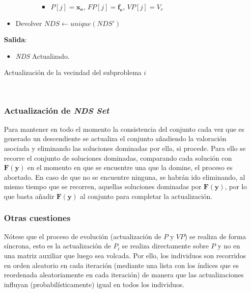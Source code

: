 \begin{center}
\begin{minipage}[H]{0.8\linewidth}
\begin{algorithm}[H]
\begin{itemize}
\begin{itemize}
\begin{itemize}
				\begin{itemize}
            		\vspace{0.15cm}\item $P[j]=\boldsymbol{x_e}$, $FP[j]=\boldsymbol{f_e}$, $VP[j]=V_e$
				\end{itemize}
        	\end{itemize}
        	\end{itemize}
        	\vspace{0.15cm}\item Devolver $NDS \gets unique(NDS')$
        \end{itemize}
    \vspace{0.3cm} 
    
    \textbf{Salida}:
    \begin{itemize}
        \item \textit{NDS} Actualizado.
    \end{itemize}
 \caption{Actualización de la vecindad del subproblema $i$}
 \label{alg:5}
\end{algorithm}
\end{minipage} \\
\end{center}

\subsubsection{Actualización de \textit{NDS Set}}

Para mantener en todo el momento la consistencia del conjunto cada vez que es generado un descendiente se actualiza el conjunto añadiendo la valoración asociada y eliminando las soluciones dominadas por ella, si procede. Para ello se recorre el conjunto de soluciones dominadas, comparando cada solución con $\boldsymbol{F}(\boldsymbol{y})$ en el momento en que se encuentre una que la domine, el proceso es abortado. En caso de que no se encuentre ninguna, se habrán ido eliminando, al mismo tiempo que se recorren, aquellas soluciones dominadas por $\boldsymbol{F}(\boldsymbol{y})$, por lo que basta añadir $\boldsymbol{F}(\boldsymbol{y})$ al conjunto para completar la actualización. \\

\subsubsection{Otras cuestiones}

Nótese que el proceso de evolución (actualización de $P$ y $VP$) se realiza de forma síncrona, esto es la actualización de $P_{i}$ se realiza directamente sobre $P$ y no en una matriz auxiliar que luego sea volcada. Por ello, los individuos son recorridos en orden aleatorio en cada iteración (mediante una lista con los índices que es reordenada aleatoriamente en cada iteración) de manera que las actualizaciones influyan (probabilísticamente) igual en todos los individuos.\\

